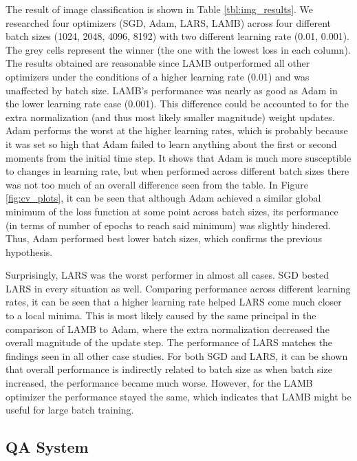 The result of image classification is shown in Table \ref{tbl:img_results}. We researched four optimizers (SGD, Adam, LARS, LAMB) across four different batch sizes (1024, 2048, 4096, 8192) with two different learning rate (0.01, 0.001). The grey cells represent the winner (the one with the lowest loss in each column). The results obtained are reasonable since LAMB outperformed all other optimizers under the conditions of a higher learning rate (0.01) and was unaffected by batch size. LAMB's performance was nearly as good as Adam in the lower learning rate case (0.001). This difference could be accounted to for the extra normalization (and thus most likely smaller magnitude) weight updates. Adam performs the worst at the higher learning rates, which is probably because it was set so high that Adam failed to learn anything about the first or second moments from the initial time step. It shows that Adam is much more susceptible to changes in learning rate, but when performed across different batch sizes there was not too much of an overall difference seen from the table. In Figure \ref{fig:cv_plots}, it can be seen that although Adam achieved a similar global minimum of the loss function at some point across batch sizes, its performance (in terms of number of epochs to reach said minimum) was slightly hindered. Thus, Adam performed best lower batch sizes, which confirms the previous hypothesis. 

Surprisingly, LARS was the worst performer in almost all cases. SGD bested LARS in every situation as well. Comparing performance across different learning rates, it can be seen that a higher learning rate helped LARS come much closer to a local minima. This is most likely caused by the same principal in the comparison of LAMB to Adam, where the extra normalization decreased the overall magnitude of the update step. The performance of LARS matches the findings seen in all other case studies. For both SGD and LARS, it can be shown that overall performance is indirectly related to batch size as when batch size increased, the performance became much worse. However, for the LAMB optimizer the performance stayed the same, which indicates that LAMB might be useful for large batch training.

\subsection{QA System}

